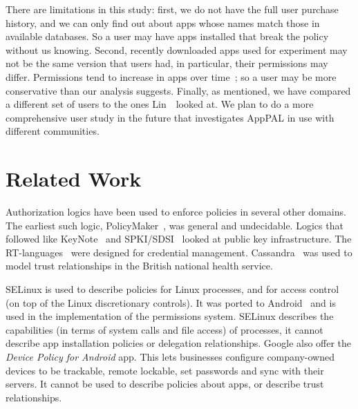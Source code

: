 \documentclass[]{llncs}
\begin{document}
There are limitations in this study:
first, we do not have the full user purchase history, and we can only find out about apps whose names match those in available databases.
So a user may have apps installed that break the policy without us knowing.
Second, recently downloaded apps used for experiment may not be the same version that users had, in particular, their permissions may differ.
Permissions tend to increase in apps over time~\cite{Wei:2012id}; so a user may be more conservative than our analysis suggests.
Finally, as mentioned, we have compared a different set of users to the ones Lin~\etal~looked at.
We plan to do a more comprehensive user study in the future that investigates AppPAL in use with different communities.

\section{Related Work}

Authorization logics have been used to enforce policies in several other domains.
The earliest such logic, PolicyMaker~\cite{Blaze:dj}, was general and undecidable.
Logics that followed like KeyNote~\cite{Blaze:1999fa} and SPKI/SDSI~\cite{Ellison:1999ui} looked at public key infrastructure.
The RT-languages~\cite{Li:2002if} were designed for credential management.
Cassandra~\cite{Becker:2004fi} was used to model trust relationships in the British national health service.

SELinux is used to describe policies for Linux processes, and for access control (on top of the Linux discretionary controls).
It was ported to Android~\cite{Smalley:2013vl} and is used in the implementation of the permissions system.
SELinux describes the capabilities (in terms of system calls and file access) of processes, it cannot describe app installation policies or delegation relationships.
Google also offer the \emph{Device Policy for Android} app.
This lets businesses configure company-owned devices to be trackable, remote lockable, set passwords and sync with their servers.
It cannot be used to describe policies about apps, or describe trust relationships.
\end{document}
